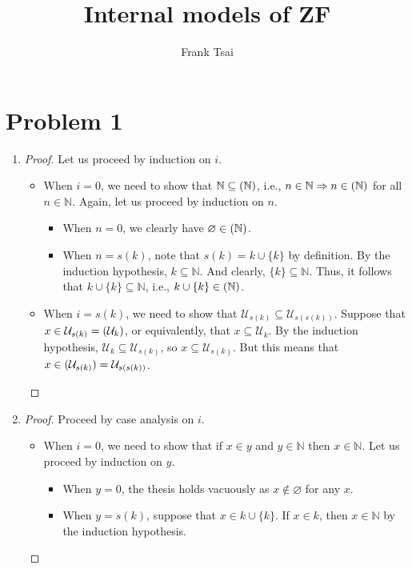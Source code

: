 \documentclass[a4paper]{article}
\title{Internal models of ZF}
\author{Frank Tsai}
\newcommand{\N}{\mathbb{N}}
\let\P\relax
\newcommand{\P}{\mathcal{P}}
\newcommand{\U}{\mathcal{U}}
\newcommand{\impl}{\Rightarrow}
\begin{document}
\maketitle

\section*{Problem 1}
\begin{enumerate}
\item\label{prob:1-1}
  \begin{proof}
    Let us proceed by induction on $i$.
    \begin{itemize}
    \item When $i = 0$, we need to show that $\N \subseteq \P(\N)$, i.e., $n \in \N \impl n \in \P(\N)$ for all $n \in \N$.
      Again, let us proceed by induction on $n$.
      \begin{itemize}
      \item When $n = 0$, we clearly have $\varnothing \in \P(\N)$.
      \item When $n = s(k)$, note that $s(k) = k \cup \{k\}$ by definition.
        By the induction hypothesis, $k \subseteq \N$.
        And clearly, $\{k\} \subseteq \N$.
        Thus, it follows that $k \cup \{k\} \subseteq \N$, i.e., $k \cup \{k\} \in \P(\N)$.
      \end{itemize}
    \item When $i = s(k)$, we need to show that $\U_{s(k)} \subseteq \U_{s(s(k))}$.
      Suppose that $x \in \U_{s(k)} = \P(\U_{k})$, or equivalently, that $x \subseteq \U_{k}$.
      By the induction hypothesis, $\U_{k} \subseteq \U_{s(k)}$, so $x \subseteq \U_{s(k)}$.
      But this means that $x \in \P(\U_{s(k)}) = \U_{s(s(k))}$.
    \end{itemize}
  \end{proof}
\item\label{prob:1-2}
  \begin{proof}
    Proceed by case analysis on $i$.
    \begin{itemize}
    \item When $i = 0$, we need to show that if $x \in y$ and $y \in \N$ then $x \in \N$.
      Let us proceed by induction on $y$.
      \begin{itemize}
      \item When $y = 0$, the thesis holds vacuously as $x \notin \varnothing$ for any $x$.
      \item When $y = s(k)$, suppose that $x \in k \cup \{k\}$.
        If $x \in k$, then $x \in \N$ by the induction hypothesis.

\end{itemize}
\end{itemize}
\end{proof}
\end{enumerate}
\end{document}
